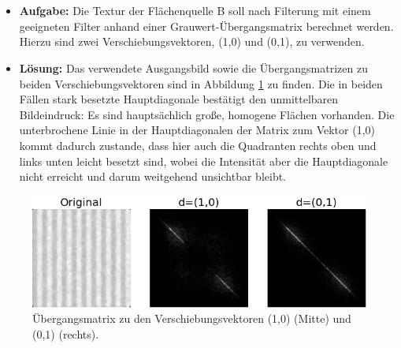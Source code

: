 \documentclass[12pt, a4paper, twoside]{report}
\begin{document}
\section{}
\begin{itemize}
\csname c@topnumber
\item \textbf{Aufgabe:} Die Textur der Flächenquelle B soll nach Filterung mit einem geeigneten Filter anhand einer Grauwert-Übergangsmatrix berechnet werden. Hierzu sind zwei Verschiebungsvektoren, (1,0) und (0,1), zu verwenden.
\item \textbf{Lösung:} Das verwendete Ausgangsbild sowie die Übergangsmatrizen zu beiden Verschiebungsvektoren sind in Abbildung \ref{transition} zu finden. Die in beiden Fällen stark besetzte Hauptdiagonale bestätigt den unmittelbaren Bildeindruck: Es sind hauptsächlich große, homogene Flächen vorhanden. Die unterbrochene Linie in der Hauptdiagonalen der Matrix zum Vektor (1,0) kommt dadurch zustande, dass hier auch die Quadranten rechts oben und links unten leicht besetzt sind, wobei die Intensität aber die Hauptdiagonale nicht erreicht und darum weitgehend unsichtbar bleibt.
\end{itemize}

\begin{figure}[h]
\centering
\includegraphics[width=\textwidth]{../bilder/transition_matrix.png}
\caption{Übergangsmatrix zu den Verschiebungsvektoren (1,0) (Mitte) und (0,1) (rechts).}
\label{transition}
\end{figure}
\end{document}
